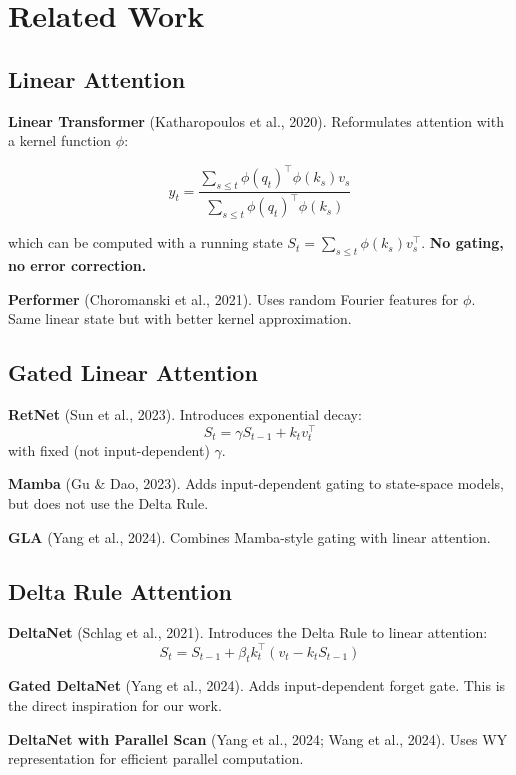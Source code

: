 
\section{Related Work}

\subsection{Linear Attention}

\textbf{Linear Transformer} (Katharopoulos et al., 2020). Reformulates attention 
with a kernel function $\phi$:

\[
y_t = \frac{\sum_{s \leq t} \phi(q_t)^\top \phi(k_s) v_s}{\sum_{s \leq t} \phi(q_t)^\top \phi(k_s)}
\tag{2.1}
\]

which can be computed with a running state $S_t = \sum_{s \leq t} \phi(k_s) v_s^\top$. 
\textbf{No gating, no error correction.}

\textbf{Performer} (Choromanski et al., 2021). Uses random Fourier features for 
$\phi$. Same linear state but with better kernel approximation.

\subsection{Gated Linear Attention}

\textbf{RetNet} (Sun et al., 2023). Introduces exponential decay:
\[
S_t = \gamma S_{t-1} + k_t v_t^\top
\tag{2.2}
\]
with fixed (not input-dependent) $\gamma$.

\textbf{Mamba} (Gu \& Dao, 2023). Adds input-dependent gating to state-space models, 
but does not use the Delta Rule.

\textbf{GLA} (Yang et al., 2024). Combines Mamba-style gating with linear attention.

\subsection{Delta Rule Attention}

\textbf{DeltaNet} (Schlag et al., 2021). Introduces the Delta Rule to linear 
attention:
\[
S_t = S_{t-1} + \beta_t k_t^\top (v_t - k_t S_{t-1})
\tag{2.3}
\]

\textbf{Gated DeltaNet} (Yang et al., 2024). Adds input-dependent forget gate. 
This is the direct inspiration for our work.

\textbf{DeltaNet with Parallel Scan} (Yang et al., 2024; Wang et al., 2024). Uses 
WY representation for efficient parallel computation.

